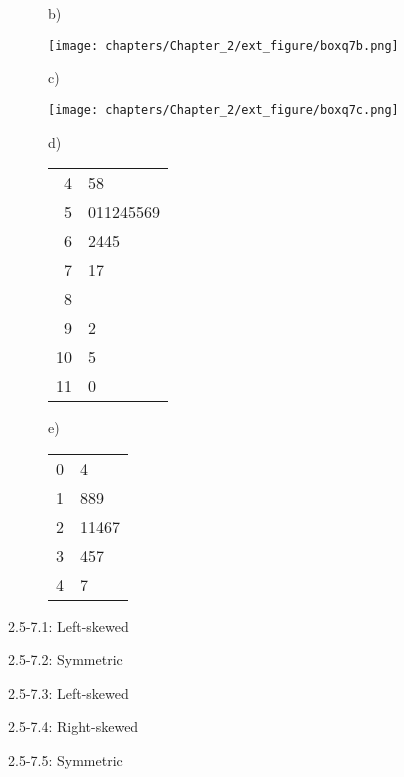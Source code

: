 \documentclass[11pt]{book}\usepackage[]{graphicx}\usepackage[]{color}
\begin{document}
\begin{exercises}
\begin{exercise}
\begin{figure}[ht]
\begin{minipage}[ht]{3cm}
  b)

  \texttt{[image: chapters/Chapter\_2/ext\_figure/boxq7b.png]}
  \end{minipage} \hfill
  \begin{minipage}[ht]{3cm}

  c)

  \texttt{[image: chapters/Chapter\_2/ext\_figure/boxq7c.png]}
  \end{minipage} \hfill
  \begin{minipage}[ht]{3cm}

  d)

    \begin{tabular}{@{} r|l @{}} \hline
  4 & 58 \\
  5 & 011245569 \\
  6 & 2445 \\
  7 & 17 \\
  8 &  \\
  9 & 2 \\
  10 & 5 \\
  11 & 0
    \end{tabular}
  \end{minipage} \hfill
  \begin{minipage}[ht]{3cm}
  e)

  \begin{tabular}{@{} r | l @{}} \hline
  0 & 4 \\
  1 & 889 \\
  2 & 11467 \\
  3 & 457 \\
  4 & 7
  \end{tabular}
  \end{minipage}

\end{figure}

\end{exercise}
\begin{solution}  %

2.5-7.1: Left-skewed

2.5-7.2: Symmetric

2.5-7.3: Left-skewed

2.5-7.4: Right-skewed

2.5-7.5: Symmetric

\end{solution}


  \begin{exercise}  %


\end{exercise}
\end{exercises}
\end{document}
